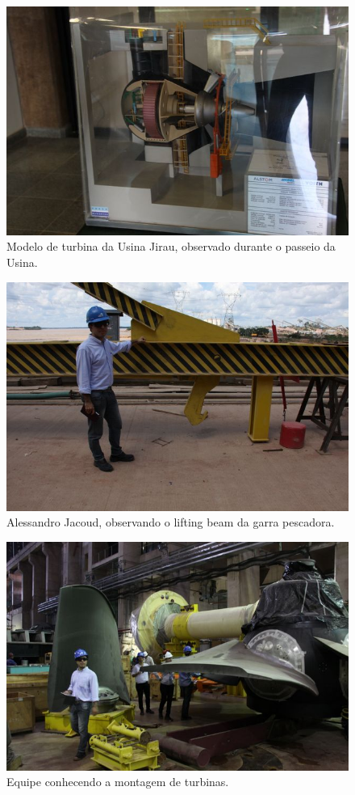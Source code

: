  \begin{figure}[ht!]
    \centering \includegraphics[width=0.6\columnwidth]{figs/jirau/jirau_02}
    \caption{Modelo de turbina da Usina Jirau, observado durante o passeio da
    Usina.}
    \label{fig:jirau2}
\end{figure}

\begin{figure}[ht!]
    \centering \includegraphics[width=0.6\columnwidth]{figs/jirau/jirau_03}
    \caption{Alessandro Jacoud, observando o lifting beam da garra pescadora.}
    \label{fig:jirau3}
\end{figure}


\begin{figure}[ht!]
    \centering \includegraphics[width=0.6\columnwidth]{figs/jirau/jirau_06}
    \caption{Equipe conhecendo a montagem de turbinas.}
    \label{fig:jirau6}
\end{figure}



